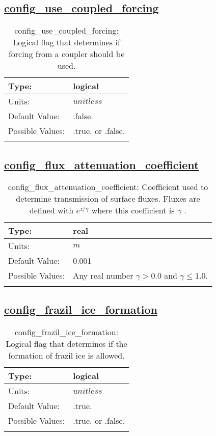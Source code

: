 \subsection[config\_use\_coupled\_forcing]{\hyperref[sec:nm_tab_forcing]{config\_use\_coupled\_forcing}}
\label{subsec:nm_sec_config_use_coupled_forcing}
\begin{center}
\begin{longtable}{| p{2.0in} | p{4.0in} |}
    \hline
    Type: & logical \\
    \hline
    Units: & $unitless$ \\
    \hline
    Default Value: & .false. \\
    \hline
    Possible Values: & .true. or .false. \\
    \hline
    \caption{config\_use\_coupled\_forcing: Logical flag that determines if forcing from a coupler should be used.}
\end{longtable}
\end{center}
\subsection[config\_flux\_attenuation\_coefficient]{\hyperref[sec:nm_tab_forcing]{config\_flux\_attenuation\_coefficient}}
\label{subsec:nm_sec_config_flux_attenuation_coefficient}
\begin{center}
\begin{longtable}{| p{2.0in} | p{4.0in} |}
    \hline
    Type: & real \\
    \hline
    Units: & $m$ \\
    \hline
    Default Value: & 0.001 \\
    \hline
    Possible Values: & Any real number $\gamma>0.0$ and $\gamma \le 1.0$. \\
    \hline
    \caption{config\_flux\_attenuation\_coefficient:  Coefficient used to determine transmission of surface fluxes. Fluxes are defined with  $e^{z/\gamma}$  where this coefficient is  $\gamma$ .}
\end{longtable}
\end{center}
\subsection[config\_frazil\_ice\_formation]{\hyperref[sec:nm_tab_forcing]{config\_frazil\_ice\_formation}}
\label{subsec:nm_sec_config_frazil_ice_formation}
\begin{center}
\begin{longtable}{| p{2.0in} | p{4.0in} |}
    \hline
    Type: & logical \\
    \hline
    Units: & $unitless$ \\
    \hline
    Default Value: & .true. \\
    \hline
    Possible Values: & .true. or .false. \\
    \hline
    \caption{config\_frazil\_ice\_formation: Logical flag that determines if the formation of frazil ice is allowed.}
\end{longtable}
\end{center}
